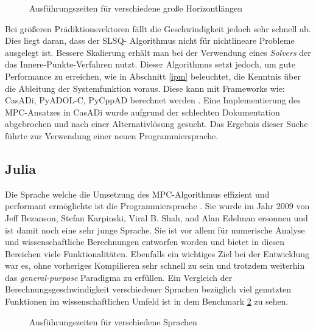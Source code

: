 \documentclass{like}
\begin{document}
\begin{figure}[ht!]
	\centering
	 
	\caption{Ausführungszeiten für verschiedene  große Horizontlängen}
	\label{fig:pythonBench}
\end{figure}

Bei größeren Prädiktionsvektoren fällt die Geschwindigkeit jedoch sehr schnell ab.
Dies liegt daran, dass der SLSQ- Algorithmus nicht für nichtlineare Probleme ausgelegt ist. Bessere Skalierung erhält man bei der Verwendung eines \textit{Solvers} der das Innere-Punkte-Verfahren nutzt. Dieser Algorithmus setzt jedoch, um gute Performance zu erreichen, wie in Abschnitt \ref{ipm} beleuchtet, die Kenntnis über die Ableitung der Systemfunktion voraus. Diese kann mit Frameworks wie: CasADi, PyADOL-C, PyCppAD berechnet werden \cite{DBLP:journals/corr/TurkinT16}. 
Eine Implementierung des \ac{MPC}-Ansatzes in CasADi wurde  aufgrund der schlechten Dokumentation abgebrochen und nach einer Alternativlösung gesucht. Das Ergebnis dieser Suche führte zur Verwendung einer neuen Programmiersprache. 


\subsection{Julia}
\label{julia}
Die Sprache welche die Umsetzung des \acl{MPC}-Algorithmus effizient und performant ermöglichte ist die Programmiersprache . Sie wurde im Jahr 2009 von Jeff Bezanson, Stefan Karpinski, Viral B. Shah, and Alan Edelman ersonnen und ist damit noch eine sehr junge Sprache. Sie ist vor allem für numerische Analyse und wissenschaftliche Berechnungen entworfen worden und bietet in diesen Bereichen viele Funktionalitäten. Ebenfalls ein wichtiges Ziel bei der Entwicklung war es, ohne vorheriges Kompilieren sehr schnell zu sein und trotzdem weiterhin das \textit{general-purpose} Paradigma zu erfüllen. Ein Vergleich der Berechnungsgeschwindigkeit verschiedener Sprachen bezüglich viel genutzten Funktionen im wissenschaftlichen Umfeld ist in dem Benchmark \ref{fig:juliaBench} zu sehen.

\begin{figure}[ht!]
	\centering
	 
	\caption{Ausführungszeiten für verschiedene Sprachen}
	\label{fig:juliaBench}
\end{figure}
\end{document}
